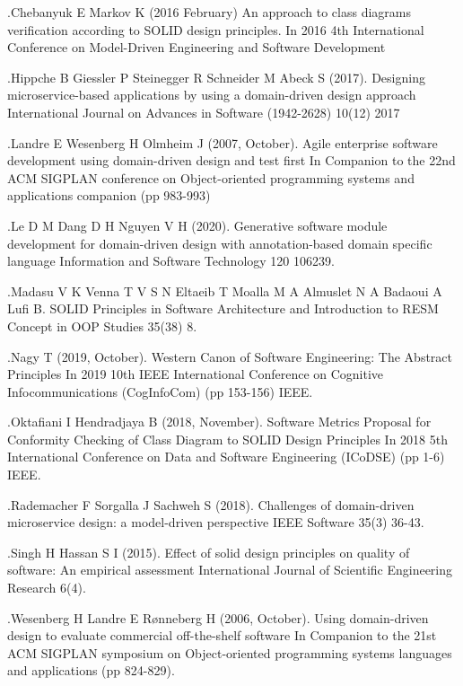 \documentclass[11pt,letterpaper]{article}
\begin{document}
\begin{thebibliography}{99} %

\bibitem.Chebanyuk E  Markov K (2016 February)
\newblock An approach to class diagrams verification according to SOLID design principles. In 2016 4th International Conference on Model-Driven Engineering and Software Development

\bibitem.Hippche B Giessler P Steinegger R Schneider M  Abeck S (2017).
\newblock Designing microservice-based applications by using a domain-driven design approach International Journal on Advances in Software (1942-2628) 10(12) 2017

\bibitem
.Landre E Wesenberg H  Olmheim J (2007, October).
\newblock Agile enterprise software development using domain-driven design and test first In Companion to the 22nd ACM SIGPLAN conference on Object-oriented programming systems and applications companion (pp 983-993)
	
\bibitem .Le D M Dang D H  Nguyen V H (2020).
\newblock Generative software module development for domain-driven design with annotation-based domain specific language Information and Software Technology 120 106239.

\bibitem .Madasu V K Venna T V S N Eltaeib T Moalla M A Almuslet N A Badaoui A Lufi B.
\newblock SOLID Principles in Software Architecture and Introduction to RESM Concept in OOP Studies 35(38) 8. 

\bibitem .Nagy T (2019, October).
\newblock Western Canon of Software Engineering: The Abstract Principles In 2019 10th IEEE International Conference on Cognitive Infocommunications (CogInfoCom) (pp 153-156) IEEE. 

\bibitem .Oktafiani I  Hendradjaya B (2018, November).
\newblock Software Metrics Proposal for Conformity Checking of Class Diagram to SOLID Design Principles In 2018 5th International Conference on Data and Software Engineering (ICoDSE) (pp 1-6) IEEE. 

 \bibitem .Rademacher F Sorgalla J  Sachweh S (2018).
\newblock Challenges of domain-driven microservice design: a model-driven perspective IEEE Software 35(3) 36-43.

 \bibitem .Singh H  Hassan S I (2015). 
\newblock Effect of solid design principles on quality of software: An empirical assessment International Journal of Scientific  Engineering Research 6(4).

 \bibitem .Wesenberg H Landre E  Rønneberg H (2006, October).
\newblock Using domain-driven design to evaluate commercial off-the-shelf software In Companion to the 21st ACM SIGPLAN symposium on Object-oriented programming systems languages and applications (pp 824-829).

	
\end{thebibliography}
\end{document}
